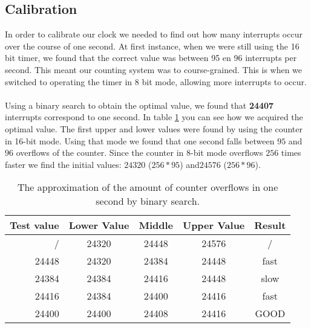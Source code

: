 \documentclass[11pt]{article}
\begin{document}
\subsection{Calibration}
In order to calibrate our clock we needed to find out how many interrupts occur over the course of one second.
At first instance, when we were still using the 16 bit timer, we found that the correct value was between 95 en 96 interrupts per second.
This meant our counting system was to course-grained.
This is when we switched to operating the timer in 8 bit mode, allowing more interrupts to occur.  
\\\\
Using a binary search to obtain the optimal value, we found that \textbf{24407} interrupts correspond to one second.
In table \ref{tab:bs} you can see how we acquired the optimal value. 
The first upper and lower values were found by using the counter in 16-bit mode.
Using that mode we found that one second falls between $95$ and $96$ overflows of the counter.
Since the counter in 8-bit mode overflows $256$ times faster we find the initial values: $24320$ ($256*95$) and$24576$ ($256*96$).

\begin{table}
	\centering
	\begin{tabular}{|r || c | c | c | c |}
		\hline
		Test value & Lower Value & Middle & Upper Value & Result \\ \hline
		/ & 24320 &  24448 & 24576 & / \\ \hline
		24448 & 24320 & 24384 & 24448 & fast \\ \hline
		24384 & 24384 & 24416 & 24448 & slow \\ \hline
		24416 & 24384 & 24400 & 24416 & fast \\ \hline
		24400 & 24400 & 24408 & 24416 & GOOD \\ \hline
	\end{tabular}
	\caption{The approximation of the amount of counter overflows in one second by binary search.}
	\label{tab:bs}
\end{table}
\end{document}
